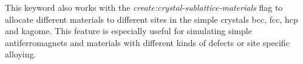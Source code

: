 This keyword also works with the \textit{create:crystal-sublattice-materials}
flag to allocate different materials to different sites in the simple crystals
bcc, fcc, hcp and kagome. This feature is especially useful for simulating
simple antiferromagnets and materials with different kinds of defects or
site specific alloying.










%
